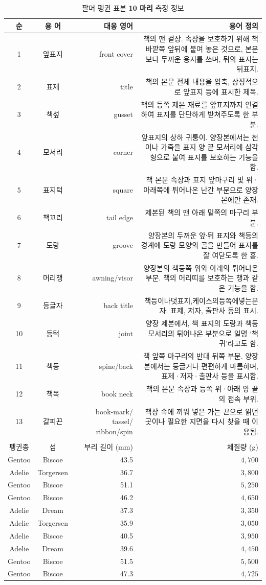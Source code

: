 \documentclass[
  letterpaper,
]{book}
\begin{document}
\hypertarget{tbl-gt-penguins}{}
\setlength{\LTpost}{0mm}
\begin{longtable}{ccrr}


\toprule
순 & 용 어 & 대응 영어 & 용어 정의 \\ 
\midrule
1 & 앞표지 & front cover & 책의 맨 겉장. 속장을 보호하기 위해 책 바깥쪽 앞뒤에 붙여 놓은 것으로, 본문보다 두꺼운 용지를 쓰며, 뒤의 표지는 뒤표지. \\ 
2 & 표제 & title & 책의 본문 전체 내용을 압축, 상징적으로 앞표지 등에 표시한 제목. \\ 
3 & 책섶 & gusset & 책의 등쪽 제본 재료를 앞표지까지 연결하여 표지를 단단하게 받쳐주도록 한 부분. \\ 
4 & 모서리 & corner & 앞표지의 상하 귀퉁이. 양장본에서는 천이나 가죽을 표지 양 끝 모서리에 삼각형으로 붙여 표지를 보호하는 기능을 함. \\ 
5 & 표지턱 & square & 책 본문 속장과 표지 앞마구리 및 위·아래쪽에 튀어나온 난간 부분으로 양장본에만 존재. \\ 
6 & 책꼬리 & tail edge & 제본된 책의 맨 아래 밑쪽의 마구리 부분. \\ 
7 & 도랑 & groove & 양장본의 두꺼운 앞∙뒤 표지와 책등의 경계에 도랑 모양의 골을 만들어 표지를 잘 여닫도록 한 홈. \\ 
8 & 머리챙 & awning/visor & 양장본의 책등쪽 위와 아래의 튀어나온 부분. 책의 머리띠를 보호하는 챙과 같은 기능을 함. \\ 
9 & 등글자 & back title & 책등이나덧표지,케이스의등쪽에넣는문자. 표제, 저자, 출판사 등의 표시. \\ 
10 & 등턱 & joint & 양장 제본에서, 책 표지의 도랑과 책등 모서리의 튀어나온 부분으로 일명 ‘책귀’라고도 함. \\ 
11 & 책등 & spine/back & 책 앞쪽 마구리의 반대 뒤쪽 부분. 양장본에서는 둥글거나 편편하게 마름하며, 표제·저자·출판사 등을 표시함. \\ 
12 & 책목 & book neck & 책의 본문 속장과 등쪽 위·아래 양 끝의 접속 부위. \\ 
13 & 갈피끈 & book-mark/ tassel/ ribbon/spin & 책장 속에 끼워 넣은 가는 끈으로 읽던 곳이나 필요한 지면을 다시 찾을 때 이용됨. \\ 
\bottomrule
\caption*{
{\large 팔머 펭귄 표본 \textbf{10 마리} 측정 정보}
} \\ 
\toprule
펭귄종 & 섬 & 부리 길이 (mm) & 체질량 (g) \\ 
\midrule
Gentoo & Biscoe & 43.5 & $4,700$ \\ 
Adelie & Torgersen & 36.7 & $3,800$ \\ 
Gentoo & Biscoe & 51.1 & $5,250$ \\ 
Gentoo & Biscoe & 46.2 & $4,650$ \\ 
Adelie & Dream & 37.3 & $3,350$ \\ 
Adelie & Torgersen & 35.9 & $3,050$ \\ 
Adelie & Biscoe & 40.5 & $3,950$ \\ 
Adelie & Dream & 39.6 & $4,450$ \\ 
Gentoo & Biscoe & 51.5 & $5,500$ \\ 
Gentoo & Biscoe & 47.3 & $4,725$ \\ 
\bottomrule
\end{longtable}
\end{document}
